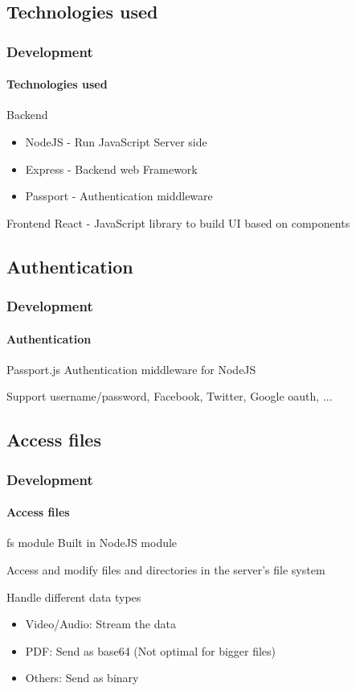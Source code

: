 \documentclass{beamer}
\begin{document}
	\subsection{Technologies used}
	\begin{frame}
		\frametitle{Development}
		\framesubtitle{Technologies used}
		\begin{alertblock}{Backend}
			\begin{itemize}
				\item NodeJS - Run JavaScript Server side
				\item Express - Backend web Framework
				\item Passport - Authentication middleware
			\end{itemize}
		\end{alertblock}
		
		\begin{alertblock}{Frontend}
			React - JavaScript library to build UI based on components
		\end{alertblock}
	\end{frame}
	
	\subsection{Authentication}
	\begin{frame}
		\frametitle{Development}
		\framesubtitle{Authentication}
		\begin{alertblock}{Passport.js}
			Authentication middleware for NodeJS\linebreak
			
			Support username/password, Facebook, Twitter, Google oauth, ...
		\end{alertblock}
	\end{frame}
	
	\subsection{Access files}
	\begin{frame}
		\frametitle{Development}
		\framesubtitle{Access files}
		\begin{alertblock}{fs module}
			Built in NodeJS module\linebreak
			
			Access and modify files and directories in the server's file system
		\end{alertblock}
		
		\begin{alertblock}{Handle different data types}
			\begin{itemize}
				\item Video/Audio: Stream the data
				\item PDF: Send as base64 (Not optimal for bigger files)
				\item Others: Send as binary
			\end{itemize}
		\end{alertblock}
	\end{frame}
	
\end{document}
